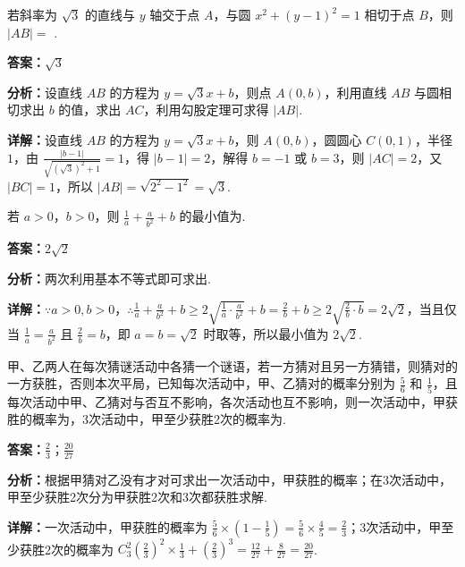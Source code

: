 \begin{question}[points=5]
若斜率为 $\sqrt{3}$ 的直线与 $y$ 轴交于点 $A$，与圆 $x^2 + (y-1)^2 = 1$ 相切于点 $B$，则 $|AB| =$ .
\fillin[{$\sqrt{3}$}]
\begin{solution}
\textbf{答案：}$\sqrt{3}$

\textbf{分析：}设直线 $AB$ 的方程为 $y = \sqrt{3}x + b$，则点 $A(0,b)$，利用直线 $AB$ 与圆相切求出 $b$ 的值，求出 $AC$，利用勾股定理可求得 $|AB|$.

\textbf{详解：}设直线 $AB$ 的方程为 $y = \sqrt{3}x + b$，则 $A(0,b)$，圆圆心 $C(0,1)$，半径 $1$，由 $\frac{|b-1|}{\sqrt{(\sqrt{3})^2+1}} = 1$，得 $|b-1|=2$，解得 $b=-1$ 或 $b=3$，则 $|AC|=2$，又 $|BC|=1$，所以 $|AB| = \sqrt{2^2-1^2} = \sqrt{3}$.
\end{solution}
\end{question}

\begin{question}[points=5]
若 $a > 0$，$b > 0$，则 $\frac{1}{a} + \frac{a}{b^2} + b$ 的最小值为.
\fillin[{$2\sqrt{2}$}]
\begin{solution}
\textbf{答案：}$2\sqrt{2}$

\textbf{分析：}两次利用基本不等式即可求出.

\textbf{详解：}$\because a>0, b>0$，$\therefore \frac{1}{a} + \frac{a}{b^2} + b \ge 2\sqrt{\frac{1}{a} \cdot \frac{a}{b^2}} + b = \frac{2}{b} + b \ge 2\sqrt{\frac{2}{b} \cdot b} = 2\sqrt{2}$，当且仅当 $\frac{1}{a} = \frac{a}{b^2}$ 且 $\frac{2}{b} = b$，即 $a=b=\sqrt{2}$ 时取等，所以最小值为 $2\sqrt{2}$.
\end{solution}
\end{question}

\begin{question}[points=5]
甲、乙两人在每次猜谜活动中各猜一个谜语，若一方猜对且另一方猜错，则猜对的一方获胜，否则本次平局，已知每次活动中，甲、乙猜对的概率分别为 $\frac{5}{6}$ 和 $\frac{1}{5}$，且每次活动中甲、乙猜对与否互不影响，各次活动也互不影响，则一次活动中，甲获胜的概率为，3次活动中，甲至少获胜2次的概率为.
\begin{solution}
\textbf{答案：}$\frac{2}{3}$；$\frac{20}{27}$

\textbf{分析：}根据甲猜对乙没有才对可求出一次活动中，甲获胜的概率；在3次活动中，甲至少获胜2次分为甲获胜2次和3次都获胜求解.

\textbf{详解：}一次活动中，甲获胜的概率为 $\frac{5}{6} \times \left(1-\frac{1}{5}\right) = \frac{5}{6} \times \frac{4}{5} = \frac{2}{3}$；3次活动中，甲至少获胜2次的概率为 $C_3^2 \left(\frac{2}{3}\right)^2 \times \frac{1}{3} + \left(\frac{2}{3}\right)^3 = \frac{12}{27} + \frac{8}{27} = \frac{20}{27}$.
\end{solution}
\end{question}

